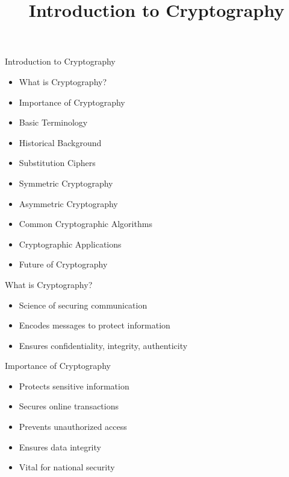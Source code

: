 

\title[]{Introduction to Cryptography}

\begin{frame}
\titlepage
\end{frame}

\begin{withoutheadline}

\begin{frame}{Introduction to Cryptography}
\begin{itemize}
    \item What is Cryptography?
    \item Importance of Cryptography
    \item Basic Terminology
    \item Historical Background
    \item Substitution Ciphers
    \item Symmetric Cryptography
    \item Asymmetric Cryptography
    \item Common Cryptographic Algorithms
    \item Cryptographic Applications
    \item Future of Cryptography
\end{itemize}
\end{frame}

\begin{frame}{What is Cryptography?}
\begin{itemize}
    \item Science of securing communication
    \item Encodes messages to protect information
    \item Ensures confidentiality, integrity, authenticity
\end{itemize}
\end{frame}

\begin{frame}{Importance of Cryptography}
\begin{itemize}
    \item Protects sensitive information
    \item Secures online transactions
    \item Prevents unauthorized access
    \item Ensures data integrity
    \item Vital for national security
\end{itemize}
\end{frame}


\end{withoutheadline}
